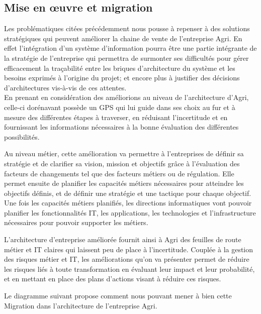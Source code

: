 \documentclass[a4paper]{report}
\begin{document}
\begin{doublespace}
\section{Mise en œuvre et migration}

Les problématiques citées précédemment nous pousse à repenser à des
solutions stratégiques qui peuvent améliorer la chaine de vente de
l'entreprise Agri. En effet l'intégration d'un système d'information
pourra être une partie intégrante de la stratégie de l'entreprise qui
permettra de surmonter ses difficultés pour gérer efficacement la
traçabilité entre les briques d'architecture du système et les besoins
exprimés à l'origine du projet; et encore plus à justifier des décisions
d'architectures vis-à-vis de ces attentes. \\
En prenant en considération des améliorions au niveau de l'architecture
d'Agri, celle-ci dorénavant possède un GPS qui lui guide dans ses choix
au fur et à mesure des différentes étapes à traverser, en réduisant
l'incertitude et en fournissant les informations nécessaires à la bonne
évaluation des différentes possibilités.

Au niveau métier, cette amélioration va permettre à l'entreprises de
définir sa stratégie et de clarifier sa vision, mission et objectifs
grâce à l'évaluation des facteurs de changements tel que des facteurs
métiers ou de régulation. Elle permet ensuite de planifier les capacités
métiers nécessaires pour atteindre les objectifs définis, et de définir
une stratégie et une tactique pour chaque objectif. \\
Une fois les capacités métiers planifiés, les directions informatiques
vont pouvoir planifier les fonctionnalités IT, les applications, les
technologies et l'infrastructure nécessaires pour pouvoir supporter les
métiers.

L'architecture d'entreprise améliorée fournit ainsi à Agri des feuilles
de route métier et IT claires qui laissent peu de place à l'incertitude.
Couplée à la gestion des risques métier et IT, les améliorations qu'on
va présenter permet de réduire les risques liés à toute transformation
en évaluant leur impact et leur probabilité, et en mettant en place des
plans d'actions visant à réduire ces risques.

Le diagramme suivant propose comment nous pouvant mener à bien cette
Migration dans l'architecture de l'entreprise Agri.


\end{doublespace}
\end{document}
